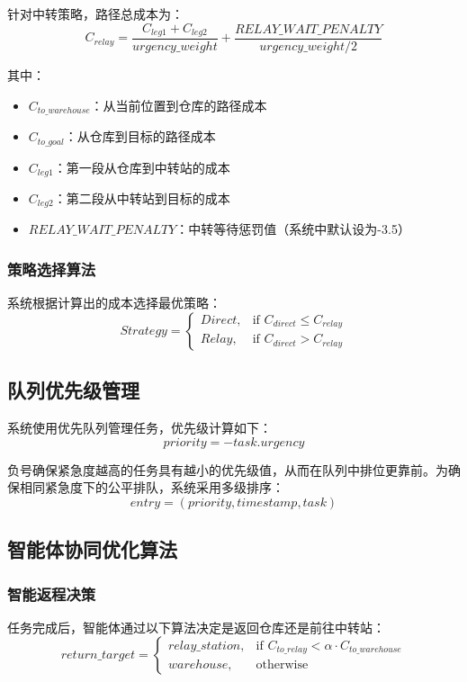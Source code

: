 \documentclass[12pt,a4paper]{article}
\begin{document}
针对中转策略，路径总成本为：
\begin{equation}
C_{relay} = \frac{C_{leg1} + C_{leg2}}{urgency\_weight} + \frac{RELAY\_WAIT\_PENALTY}{urgency\_weight/2}
\end{equation}

其中：
\begin{itemize}
\item $C_{to\_warehouse}$：从当前位置到仓库的路径成本
\item $C_{to\_goal}$：从仓库到目标的路径成本
\item $C_{leg1}$：第一段从仓库到中转站的成本
\item $C_{leg2}$：第二段从中转站到目标的成本
\item $RELAY\_WAIT\_PENALTY$：中转等待惩罚值（系统中默认设为-3.5）
\end{itemize}

\subsubsection{策略选择算法}
系统根据计算出的成本选择最优策略：
\begin{equation}
Strategy = 
\begin{cases}
Direct, & \text{if } C_{direct} \leq C_{relay} \\
Relay, & \text{if } C_{direct} > C_{relay}
\end{cases}
\end{equation}

\subsection{队列优先级管理}

系统使用优先队列管理任务，优先级计算如下：
\begin{equation}
priority = -task.urgency
\end{equation}

负号确保紧急度越高的任务具有越小的优先级值，从而在队列中排位更靠前。为确保相同紧急度下的公平排队，系统采用多级排序：
\begin{equation}
entry = (priority, timestamp, task)
\end{equation}

\subsection{智能体协同优化算法}

\subsubsection{智能返程决策}
任务完成后，智能体通过以下算法决定是返回仓库还是前往中转站：
\begin{equation}
return\_target = 
\begin{cases}
relay\_station, & \text{if } C_{to\_relay} < \alpha \cdot C_{to\_warehouse} \\
warehouse, & \text{otherwise}
\end{cases}
\end{equation}
\end{document}
